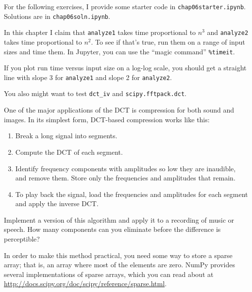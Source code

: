 \documentclass[12pt]{book}
\begin{document}
For the following exercises, I provide some starter code in
{\tt chap06starter.ipynb}.
Solutions are in {\tt chap06soln.ipynb}.

\begin{exercise}
In this chapter I claim that {\tt analyze1} takes time proportional
to $n^3$ and {\tt analyze2} takes time proportional to $n^2$.  To
see if that's true, run them on a range of input sizes and time
them.  In Jupyter, you can use the ``magic command'' \verb"%timeit".

If you plot run time versus input size on a log-log scale, you
should get a straight line with slope 3 for  {\tt analyze1} and
slope 2 for {\tt analyze2}.

You also might want to test \verb"dct_iv"
and {\tt scipy.fftpack.dct}.

\end{exercise}


\begin{exercise}
One of the major applications of the DCT is compression for both
sound and images.  In its simplest form, DCT-based compression
works like this:

\begin{enumerate}

\item Break a long signal into segments.

\item Compute the DCT of each segment.

\item Identify frequency components with amplitudes so low they are
  inaudible, and remove them.  Store only the frequencies and
  amplitudes that remain.

\item To play back the signal, load the frequencies and amplitudes
  for each segment and apply the inverse DCT.

\end{enumerate}

Implement a version of this algorithm and apply it to a recording
of music or speech.  How many components can you eliminate before
the difference is perceptible?

In order to make this method practical, you need some way to store a
sparse array; that is, an array where most of the elements are zero.
NumPy provides several implementations of sparse arrays, which you can
read about at
\url{http://docs.scipy.org/doc/scipy/reference/sparse.html}.
\end{exercise}
\end{document}
